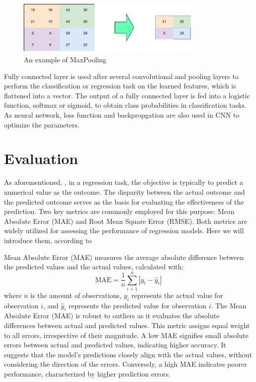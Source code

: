 \documentclass[12pt,a4paper,english
]{tunithesis}
\begin{document}
\begin{figure}
  \begin{center}
    \includegraphics[width=0.8\textwidth]{thesis/img/maxpooling.pdf}
  \end{center}
  \caption[MaxPooling]{An example of MaxPooling}
  \label{fig:maxpooling}
\end{figure}

Fully connected layer is used after several convolutional and pooling layers to perform the classification or regression task on the learned features, which is flattened into a vector. The output of a fully connected layer is fed into a logistic function, softmax or sigmoid, to obtain class probabilities in classification tasks. As neural network, loss function and backpropgation are also used in CNN to optimize the parameters.


\section{Evaluation}
As aforementioned, , in a regression task, the objective is typically to predict a numerical value as the outcome. The disparity between the actual outcome and the predicted outcome serves as the basis for evaluating the effectiveness of the prediction. Two key metrics are commonly employed for this purpose: Mean Absolute Error (MAE) and Root Mean Square Error (RMSE). Both metrics are widely utilized for assessing the performance of regression models. Here we will introduce them, according to \textcite{tyagi2022, chai2014}

Mean Absolute Error (MAE) measures the average absolute difference between the predicted values and the actual values, calculated with: 
\begin{equation}
    \mathrm{MAE}=\frac{1}{n} \sum_{i=1}^n\left|y_i-\hat{y}_i\right|
\end{equation}
where $n$ is the amount of observations, $y_i$ represents the actual value for observation $i$, and $\hat{y}_i$ represents the predicted value for observation $i$. The Mean Absolute Error (MAE) is robust to outliers as it evaluates the absolute differences between actual and predicted values. This metric assigns equal weight to all errors, irrespective of their magnitude. A low MAE signifies small absolute errors between actual and predicted values, indicating higher accuracy. It suggests that the model's predictions closely align with the actual values, without considering the direction of the errors. Conversely, a high MAE indicates poorer performance, characterized by higher prediction errors.
\end{document}
